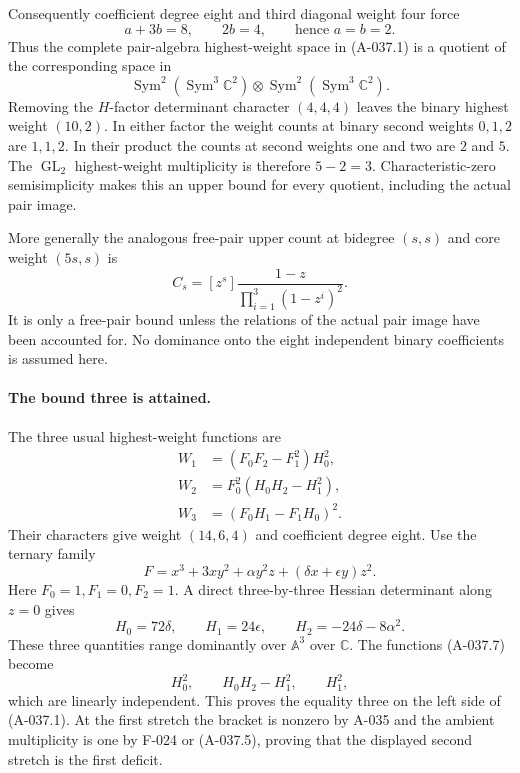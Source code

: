 Consequently coefficient degree eight and third
diagonal weight four force
\[
                       a+3b=8,\qquad 2b=4,
             \qquad\text{hence }a=b=2.                        \tag{A-037.6}
\]
Thus the complete pair-algebra highest-weight
space in (A-037.1) is a quotient of the corresponding
space in
\[
 \operatorname{Sym}^2(\operatorname{Sym}^3\mathbb C^2)
          \otimes
 \operatorname{Sym}^2(\operatorname{Sym}^3\mathbb C^2).
 \]
Removing the \(H\)-factor determinant character
\((4,4,4)\) leaves the binary highest weight
\((10,2)\).
In either factor the weight counts at binary
second weights \(0,1,2\) are \(1,1,2\).
In their product the counts at second weights
one and two are \(2\) and \(5\).
The \(\operatorname{GL}_2\) highest-weight
multiplicity is therefore \(5-2=3\).
Characteristic-zero semisimplicity makes this
an upper bound for every quotient, including
the actual pair image.

More generally the analogous free-pair upper count
at bidegree \((s,s)\) and core weight \((5s,s)\) is
\[
 C_s=[z^s]\frac{1-z}{\prod_{i=1}^3(1-z^i)^2}.
 \]
It is only a free-pair bound unless the relations
of the actual pair image have been accounted for.
No dominance onto the eight independent binary
coefficients is assumed here.

\paragraph{The bound three is attained.}
The three usual highest-weight functions are
\[
 \begin{split}
 W_1&=(F_0F_2-F_1^2)H_0^2,\\
 W_2&=F_0^2(H_0H_2-H_1^2),\\
 W_3&=(F_0H_1-F_1H_0)^2.
 \end{split}                                                   \tag{A-037.7}
\]
Their characters give weight \((14,6,4)\) and
coefficient degree eight.
Use the ternary family
\[
 F=x^3+3xy^2+\alpha y^2z+(\delta x+\epsilon y)z^2.
 \]
Here \(F_0=1,F_1=0,F_2=1\).
A direct three-by-three Hessian determinant along
\(z=0\) gives
\[
 H_0=72\delta,\qquad H_1=24\epsilon,\qquad
                     H_2=-24\delta-8\alpha^2.                \tag{A-037.8}
\]
These three quantities range dominantly over
\(\mathbb A^3\) over \(\mathbb C\).
The functions (A-037.7) become
\[
                     H_0^2,\qquad H_0H_2-H_1^2,\qquad H_1^2,
 \]
which are linearly independent. This proves the
equality three on the left side of (A-037.1).
At the first stretch the bracket is nonzero by
A-035 and the ambient multiplicity is one by
F-024 or (A-037.5), proving that the displayed
second stretch is the first deficit.

